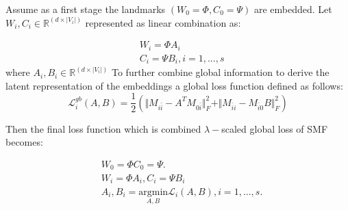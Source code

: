 \begin{itemize}
Assume as a first stage  the landmarks $(W_0 = \Phi, C_0 = \Psi)$ are embedded. Let $W_i, C_i \in \mathbb{R}^{(d\times|V_i|)}$ represented as linear combination as:

\begin{align*}
& W_i= \Phi A_i \\
& C_i= \Psi B_i, i=1,..., s
\end{align*}
where $A_i, B_i \in \mathbb{R}^{(d\times|V_i|)}$
To further combine global information to derive the latent representation of the embeddings a global loss function defined as follows:
\begin{equation}
\mathcal{L}_{i}^{gb}(A,B)=\frac{1}{2}(\Vert M_{i\bar{i}} - A^T M_{0\bar{i}}\Vert_{F}^2 +\Vert M_{\bar{i}i} - M_{\bar{i}0}B\Vert_{F}^2)
\end{equation} 

Then the final loss function which is combined $\lambda-$scaled global loss of SMF becomes:

\begin{align*}
& W_0= \Phi C_0= \Psi . \\
& W_i= \Phi A_i, C_i= \Psi B_i \\
& A_i,B_i=\underset{A,B}{\mathrm{argmin}}\mathcal{L}_{i}(A,B),  i=1,..., s. 
\end{align*}




\end{itemize}


